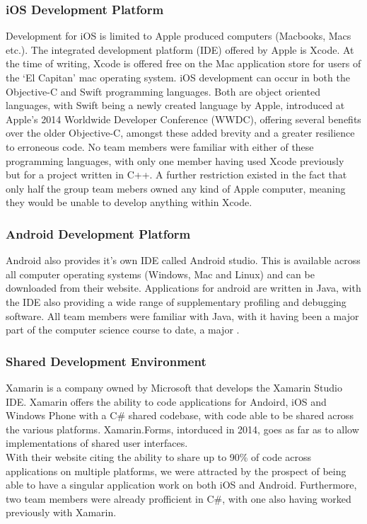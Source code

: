 \documentclass[main.tex]{subfiles}
\begin{document}
\subsubsection{iOS Development Platform}
Development for iOS is limited to Apple produced computers (Macbooks, Macs etc.). The integrated development platform (IDE) offered by Apple is Xcode. At the time of writing, Xcode is offered free on the Mac application store for users of the `El Capitan' mac operating system. iOS development can occur in both the Objective-C and Swift programming languages. Both are object oriented languages, with Swift being a newly created language by Apple, introduced at Apple's 2014 Worldwide Developer Conference (WWDC), offering several benefits over the older Objective-C, amongst these added brevity and a greater resilience to erroneous code. No team members were familiar with either of these programming languages, with only one member having used Xcode previously but for a project written in C++. A further restriction existed in the fact that only half the group team mebers owned any kind of Apple computer, meaning they would be unable to develop anything within Xcode.

\subsubsection{Android Development Platform}

Android also provides it's own IDE called Android studio. This is available across all computer operating systems (Windows, Mac and Linux) and can be downloaded from their website. Applications for android are written in Java, with the IDE also providing a wide range of supplementary profiling and debugging software. All team members were familiar with Java, with it having been a major part of the computer science course to date, a major .

\subsubsection{Shared Development Environment}

Xamarin is a company owned by Microsoft that develops the Xamarin Studio IDE. Xamarin offers the ability to code applications for Andoird, iOS and Windows Phone with a C\# shared codebase, with code able to be shared across the various platforms. Xamarin.Forms, intorduced in 2014, goes as far as to allow implementations of shared user interfaces.\\
With their website citing the ability to share up to 90\% of code across applications on multiple platforms, we were attracted by the prospect of being able to have a singular application work on both iOS and Android. Furthermore, two team members were already profficient in C\#, with one also having worked previously with Xamarin.
 
\end{document}
